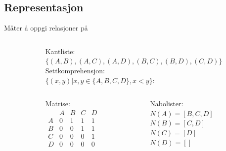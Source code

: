 \subsection*{Representasjon}
\begin{frame}[fragile]{Måter å oppgi relasjoner på}
    \begin{columns}
        \begin{column}{0.3\textwidth}
        \end{column}
        \begin{column}{0.65\textwidth}
            Kantliste:\\
            $\{(A, B), (A, C), (A, D), (B, C), (B, D), (C, D)\}$\\[5mm]
            Settkomprehensjon:\\
            $\{(x, y) | x, y \in \{A,B,C,D\}, x < y\}$:\\[5mm]
            \begin{columns}
                \begin{column}{0.27\textwidth}
                    Matrise:\\
                    \begin{math}
                        \begin{matrix}
                              & A & B & C & D\\
                            A & 0 & 1 & 1 & 1\\
                            B & 0 & 0 & 1 & 1\\
                            C & 0 & 0 & 0 & 1\\
                            D & 0 & 0 & 0 & 0
                        \end{matrix}
                    \end{math}
                \end{column}
                \begin{column}{0.38\textwidth}
                    Nabolister:\\        
                    $N(A) = [B, C, D]$\\
                    $N(B) = [C, D]$\\
                    $N(C) = [D]$\\
                    $N(D) = []$
                \end{column} 
            \end{columns}
        \end{column}
    \end{columns}
\end{frame}

